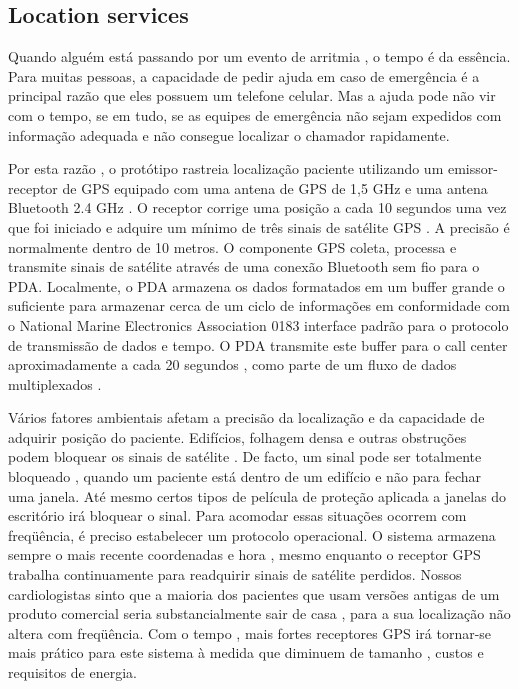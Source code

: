 \documentclass[12pt]{article} %
\begin{document}

\subsection{Location services} %

Quando alguém está passando por um evento de arritmia , o tempo é da essência. Para muitas pessoas, a capacidade de pedir ajuda em caso de emergência é a principal razão que eles possuem um telefone celular. Mas a ajuda pode não vir com o tempo, se em tudo, se as equipes de emergência não sejam expedidos com informação adequada e não consegue localizar o chamador rapidamente.

Por esta razão , o protótipo rastreia localização paciente utilizando um emissor-receptor de GPS equipado com uma antena de GPS de 1,5 GHz e uma antena Bluetooth 2.4 GHz . O receptor corrige uma posição a cada 10 segundos uma vez que foi iniciado e adquire um mínimo de três sinais de satélite GPS . A precisão é normalmente dentro de 10 metros. O componente GPS coleta, processa e transmite sinais de satélite através de uma conexão Bluetooth sem fio para o PDA. Localmente, o PDA armazena os dados formatados em um buffer grande o suficiente para armazenar cerca de um ciclo de informações em conformidade com o National Marine Electronics Association 0183 interface padrão para o protocolo de transmissão de dados e tempo. O PDA transmite este buffer para o call center aproximadamente a cada 20 segundos , como parte de um fluxo de dados multiplexados .

Vários fatores ambientais afetam a precisão da localização e da capacidade de adquirir posição do paciente. Edifícios, folhagem densa e outras obstruções podem bloquear os sinais de satélite . De facto, um sinal pode ser totalmente bloqueado , quando um paciente está dentro de um edifício e não para fechar uma janela. Até mesmo certos tipos de película de proteção aplicada a janelas do escritório irá bloquear o sinal. Para acomodar essas situações ocorrem com freqüência, é preciso estabelecer um protocolo operacional. O sistema armazena sempre o mais recente coordenadas e hora , mesmo enquanto o receptor GPS trabalha continuamente para readquirir sinais de satélite perdidos. Nossos cardiologistas sinto que a maioria dos pacientes que usam versões antigas de um produto comercial seria substancialmente sair de casa , para a sua localização não altera com freqüência. Com o tempo , mais fortes receptores GPS irá tornar-se mais prático para este sistema à medida que diminuem de tamanho , custos e requisitos de energia.
\end{document}
